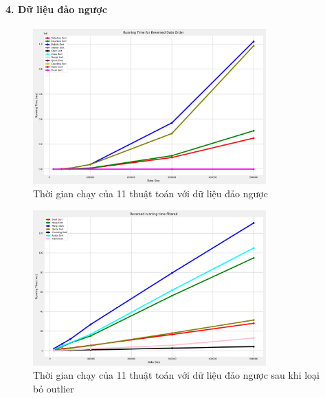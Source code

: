 \paragraph{4. Dữ liệu đảo ngược}
\begin{figure}[H]
    \centering
    \includegraphics[width=0.8\textwidth]{img/results/reversed_running_time.png}
    \caption{Thời gian chạy của 11 thuật toán với dữ liệu đảo ngược}
\end{figure}

\begin{figure}[H]
    \centering
    \includegraphics[width=0.8\textwidth]{img/results/reversed_running_time_filtered.png}
    \caption{
        Thời gian chạy của 11 thuật toán với dữ liệu đảo ngược sau khi loại bỏ outlier
    }
\end{figure}











